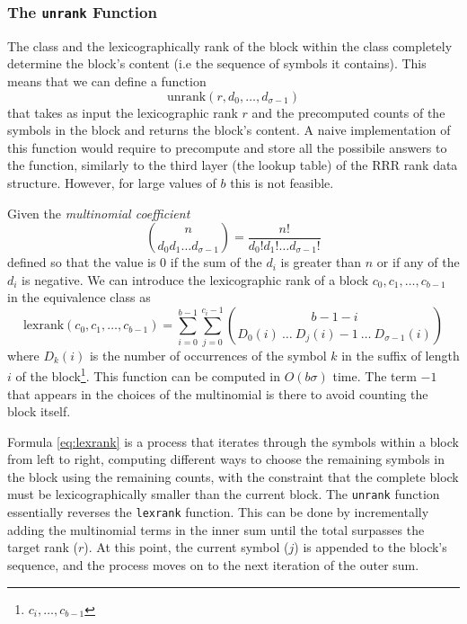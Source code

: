\subsubsection*{The \texttt{unrank} Function}

\noindent The class and the lexicographically rank of the block within the class completely determine the block's content (i.e the sequence of symbols it contains). This means that we can define a function
$$\textrm{unrank}(r,d_0, \dots, d_{\sigma-1})$$
that takes as input the lexicographic rank $r$ and the precomputed counts of the symbols in the block and returns the block's content. A naive implementation of this function would require to precompute and store all the possibile answers to the function, similarly to the third layer (the lookup table) of the RRR rank data structure. However, for large values of $b$ this is not feasible.

\noindent Given the \emph{multinomial coefficient}
\begin{equation} \label{eq:multinomial}
    \binom{n}{d_0d_1 \dots d_{\sigma-1}} = \frac{n!}{d_0!d_1! \dots d_{\sigma-1}!}
\end{equation}
defined so that the value is $0$ if the sum of the $d_i$ is greater than $n$ or if any of the $d_i$ is negative. We can introduce the lexicographic rank of a block $c_0, c_1, \dots, c_{b-1}$ in the equivalence class as
\begin{equation} \label{eq:lexrank}
    \textrm{lexrank}(c_0, c_1, \dots, c_{b-1}) = \sum_{i=0}^{b-1} \sum_{j=0}^{c_i -1} \binom{b-1-i}{D_0(i) ~ \dots ~ D_j(i) -1 ~ \dots ~ D_{\sigma-1}(i)}
\end{equation}
where $D_k(i)$ is the number of occurrences of the symbol $k$ in the suffix of length $i$ of the block\footnote{$c_i, \dots, c_{b-1}$}. This function can be computed in $O(b \sigma)$ time. The term $-1$ that appears in the choices of the multinomial is there to avoid counting the block itself.

\noindent Formula \ref{eq:lexrank} is a process that iterates through the symbols within a block from left to right, computing different ways to choose the remaining symbols in the block using the remaining counts, with the constraint that the complete block must be lexicographically smaller than the current block. The \texttt{unrank} function essentially reverses the \texttt{lexrank} function. This can be done by incrementally adding the multinomial terms in the inner sum until the total surpasses the target rank ($r$). At this point, the current symbol ($j$) is appended to the block's sequence, and the process moves on to the next iteration of the outer sum.

